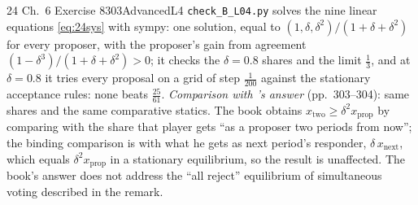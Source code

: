 \begin{exsol}{24}{\MG{} Ch.~6 Exercise 8}{303}{Advanced}{L4}
\verify \texttt{check\_B\_L04.py} solves the nine linear equations \eqref{eq:24sys} with sympy: one
solution, equal to $(1, \delta, \delta^2)/(1+\delta+\delta^2)$ for every proposer, with the proposer's
gain from agreement $(1 - \delta^3)/(1+\delta+\delta^2) > 0$; it checks the $\delta = 0.8$ shares and
the limit $\frac13$, and at $\delta = 0.8$ it tries every proposal on a grid of step $\frac1{200}$
against the stationary acceptance rules: none beats $\frac{25}{61}$. \emph{Comparison with \MG{}'s
answer} (pp.~303--304): same shares and the same comparative statics. The book obtains $x_{\text{two}}
\ge \delta^2 x_{\text{prop}}$ by comparing with the share that player gets ``as a proposer two periods
from now''; the binding comparison is with what he gets as next period's responder, $\delta\, x_{\text{next}}$,
which equals $\delta^2 x_{\text{prop}}$ in a stationary equilibrium, so the result is unaffected. The
book's answer does not address the ``all reject'' equilibrium of simultaneous voting described in the
remark.

\end{exsol}
